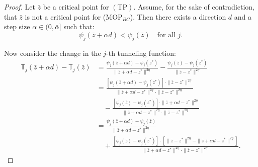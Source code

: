\documentclass[amsa]{ipart}
\theoremstyle{plain}
\numberwithin{equation}{section}
\newcommand{\xlm}{z^*}                    %
\newcommand{\obj}[1]{\psi_{#1}}               %
\newcommand{\tunobj}[1]{\mathbb{T}_{#1}}               %
\begin{document}
\begin{proof}


Let $\bar{z}$ be a critical point for $(\mathrm{TP})$.  
Assume, for the sake of contradiction, that $\bar{z}$ is not a critical point for (MOP$_{BC}$).  
Then there exists a direction $d$ and a step size $\alpha \in (0, \bar{\alpha}]$ such that:
\[
\obj{j}(\bar{z} + \alpha d) < \obj{j}(\bar{z}) \quad \text{for all } j.
\]

Now consider the change in the $j$-th tunneling function:
\begin{align*}
\tunobj{j}(\bar{z} + \alpha d) - \tunobj{j}(\bar{z}) 
&= \frac{\obj{j}(\bar{z} + \alpha d) - \obj{j}(\xlm)}{\| \bar{z} + \alpha d - \xlm \|^{2\eta}} 
    - \frac{\obj{j}(\bar{z}) - \obj{j}(\xlm)}{\| \bar{z} - \xlm \|^{2\eta}} \\
&= \frac{\left[ \obj{j}(\bar{z} + \alpha d) - \obj{j}(\xlm) \right] \cdot \|\bar{z} - \xlm\|^{2\eta} 
     }%
    {\| \bar{z} + \alpha d - \xlm \|^{2\eta} \cdot \| \bar{z} - \xlm \|^{2\eta}}\\
    &\quad-\frac{\left[\obj{j}(\bar{z}) - \obj{j}(\xlm)\right] \cdot \| \bar{z} + \alpha d - \xlm \|^{2\eta}}{\| \bar{z} + \alpha d - \xlm \|^{2\eta} \cdot \| \bar{z} - \xlm \|^{2\eta}} \\
&= \frac{\obj{j}(\bar{z} + \alpha d) - \obj{j}(\bar{z})}{\| \bar{z} + \alpha d - \xlm \|^{2\eta}} \\
&\quad + \frac{\left[\obj{j}(\bar{z}) - \obj{j}(\xlm)\right] \cdot 
     \left[ \| \bar{z} - \xlm \|^{2\eta} - \| \bar{z} + \alpha d - \xlm \|^{2\eta} \right]}%
    {\| \bar{z} + \alpha d - \xlm \|^{2\eta} \cdot \| \bar{z} - \xlm \|^{2\eta}}.
\end{align*}


\end{proof}
\end{document}

